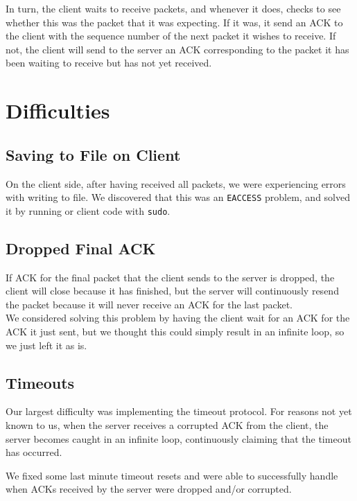 \documentclass{article}
\begin{document}
In turn, the client waits to receive packets, and whenever it does, checks to see whether this was the packet that it was expecting. If it was, it send an ACK to the client with the sequence number of the next packet it wishes to receive. If not, the client will send to the server an ACK corresponding to the packet it has been waiting to receive but has not yet received.
\section{Difficulties}
\subsection{Saving to File on Client}
On the client side, after having received all packets, we were experiencing errors with writing to file. We discovered that this was an \texttt{EACCESS} problem, and solved it by running or client code with \texttt{sudo}.
\subsection{Dropped Final ACK}
If ACK for the final packet that the client sends to the server is dropped, the client will close because it has finished, but the server will continuously resend the packet because it will never receive an ACK for the last packet. \\

We considered solving this problem by having the client wait for an ACK for the ACK it just sent, but we thought this could simply result in an infinite loop, so we just left it as is.
\subsection{Timeouts}
Our largest difficulty was implementing the timeout protocol. For reasons not yet known to us, when the server receives a corrupted ACK from the client, the server becomes caught in an infinite loop, continuously claiming that the timeout has occurred. 

We fixed some last minute timeout resets and were able to successfully handle when ACKs received by the server were dropped and/or corrupted.
\end{document}
